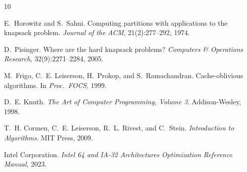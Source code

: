 \documentclass[a4paper,USenglish]{lipics-v2021}
\begin{document}
\begin{thebibliography}{10}

E.~Horowitz and S.~Sahni.
\newblock Computing partitions with applications to the knapsack problem.
\newblock \emph{Journal of the ACM}, 21(2):277--292, 1974.

D.~Pisinger.
\newblock Where are the hard knapsack problems?
\newblock \emph{Computers \& Operations Research}, 32(9):2271--2284, 2005.

M.~Frigo, C.~E. Leiserson, H.~Prokop, and S.~Ramachandran.
\newblock Cache-oblivious algorithms.
\newblock In \emph{Proc.\ FOCS}, 1999.

D.~E. Knuth.
\newblock \emph{The Art of Computer Programming, Volume 3}.
\newblock Addison-Wesley, 1998.

T.~H. Cormen, C.~E. Leiserson, R.~L. Rivest, and C.~Stein.
\newblock \emph{Introduction to Algorithms}.
\newblock MIT Press, 2009.

Intel Corporation.
\newblock \emph{Intel 64 and IA-32 Architectures Optimization Reference Manual},
  2023.

\end{thebibliography}

\appendix
\end{document}
